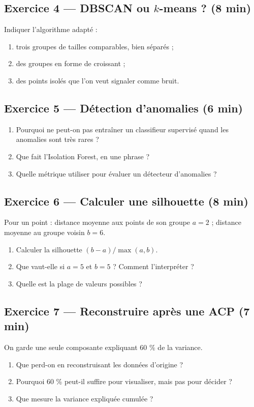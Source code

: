 \subsection*{Exercice 4 --- DBSCAN ou $k$-means ? \hfill \normalfont\footnotesize (8 min)}
Indiquer l'algorithme adapté :
\begin{enumerate}
  \item trois groupes de tailles comparables, bien séparés ;
  \item des groupes en forme de croissant ;
  \item des points isolés que l'on veut signaler comme bruit.
\end{enumerate}

\subsection*{Exercice 5 --- Détection d'anomalies \hfill \normalfont\footnotesize (6 min)}
\begin{enumerate}
  \item Pourquoi ne peut-on pas entraîner un classifieur supervisé quand les
        anomalies sont très rares ?
  \item Que fait l'Isolation Forest, en une phrase ?
  \item Quelle métrique utiliser pour évaluer un détecteur d'anomalies ?
\end{enumerate}


\subsection*{Exercice 6 --- Calculer une silhouette \hfill \normalfont\footnotesize (8 min)}
Pour un point : distance moyenne aux points de son groupe $a=2$ ; distance
moyenne au groupe voisin $b=6$.
\begin{enumerate}
  \item Calculer la silhouette $(b-a)/\max(a,b)$.
  \item Que vaut-elle si $a=5$ et $b=5$ ? Comment l'interpréter ?
  \item Quelle est la plage de valeurs possibles ?
\end{enumerate}

\subsection*{Exercice 7 --- Reconstruire après une ACP \hfill \normalfont\footnotesize (7 min)}
On garde une seule composante expliquant 60 \% de la variance.
\begin{enumerate}
  \item Que perd-on en reconstruisant les données d'origine ?
  \item Pourquoi 60 \% peut-il suffire pour visualiser, mais pas pour décider ?
  \item Que mesure la variance expliquée cumulée ?
\end{enumerate}

